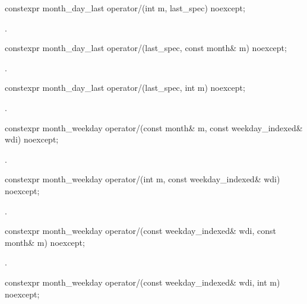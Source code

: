 \begin{itemdecl}
constexpr month_day_last
  operator/(int m, last_spec) noexcept;
\end{itemdecl}

\begin{itemdescr}
\pnum
\returns {}.
\end{itemdescr}

\begin{itemdecl}
constexpr month_day_last
  operator/(last_spec, const month& m) noexcept;
\end{itemdecl}

\begin{itemdescr}
\pnum
\returns {}.
\end{itemdescr}

\begin{itemdecl}
constexpr month_day_last
  operator/(last_spec, int m) noexcept;
\end{itemdecl}

\begin{itemdescr}
\pnum
\returns {}.
\end{itemdescr}

\begin{itemdecl}
constexpr month_weekday
  operator/(const month& m, const weekday_indexed& wdi) noexcept;
\end{itemdecl}

\begin{itemdescr}
\pnum
\returns {}.
\end{itemdescr}

\begin{itemdecl}
constexpr month_weekday
  operator/(int m, const weekday_indexed& wdi) noexcept;
\end{itemdecl}

\begin{itemdescr}
\pnum
\returns {}.
\end{itemdescr}

\begin{itemdecl}
constexpr month_weekday
  operator/(const weekday_indexed& wdi, const month& m) noexcept;
\end{itemdecl}

\begin{itemdescr}
\pnum
\returns {}.
\end{itemdescr}

\begin{itemdecl}
constexpr month_weekday
  operator/(const weekday_indexed& wdi, int m) noexcept;
\end{itemdecl}

